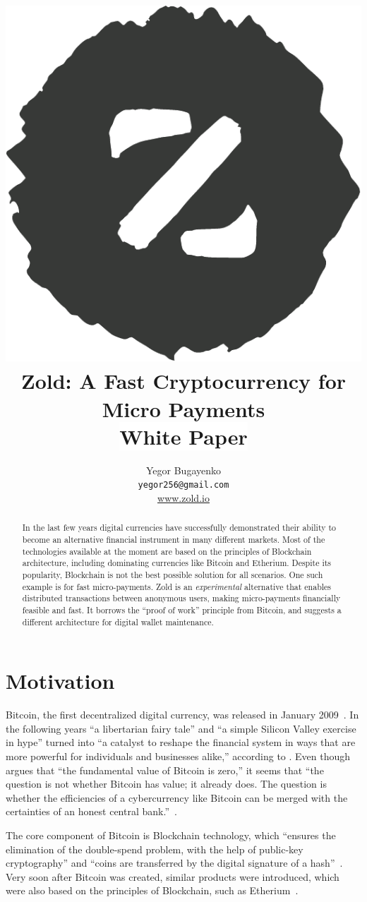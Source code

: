 \documentclass[11pt,oneside]{article}
\title{\includegraphics[scale=0.3]{../images/logo.pdf}\\Zold: A Fast Cryptocurrency for Micro Payments\\\colorbox{white}{White Paper}}
\author{Yegor Bugayenko\\
  \texttt{yegor256@gmail.com}\\
  \href{https://www.zold.io}{www.zold.io}\\[1em]
  \href{https://github.com/zold-io/papers/releases/tag/\zoldversion}{\texttt{\zoldversion}}}
\begin{document}
\raggedbottom

\maketitle
\begin{abstract}
In the last few years digital currencies have successfully demonstrated
their ability to become an alternative financial instrument in many
different markets. Most of the technologies available at the moment are
based on the principles of Blockchain architecture, including
dominating currencies like Bitcoin and Etherium. Despite its
popularity, Blockchain is not the best possible solution for all scenarios.
One such example is for fast micro-payments.
Zold is an \emph{experimental} alternative that enables distributed transactions between
anonymous users, making micro-payments financially feasible and fast.
It borrows the ``proof of work'' principle from Bitcoin,
and suggests a different architecture for digital wallet maintenance.
\end{abstract}

\section{Motivation}

Bitcoin, the first decentralized digital currency, was released in January 2009~\parencite{nakamoto2008}.
In the following years ``a libertarian fairy tale'' and ``a simple Silicon Valley exercise in hype''
turned into ``a catalyst to reshape the financial system in ways that are more
powerful for individuals and businesses alike,'' according to \textcite{andreessen2014}.
Even though \textcite{cheah2015} argues that
``the fundamental value of Bitcoin is zero,''
it seems that ``the question is not whether Bitcoin has value; it already does.
The question is whether the efficiencies of a cybercurrency
like Bitcoin can be merged with the certainties of an honest central bank.''~\parencite{van2014}.

The core component of Bitcoin is Blockchain technology, which
``ensures the elimination of the double-spend problem, with the help
of public-key cryptography'' and ``coins are transferred by the
digital signature of a hash''~\parencite{pilkington2016}.
Very soon after Bitcoin was created, similar products were introduced,
which were also based on the principles of Blockchain, such as
Etherium~\parencite{buterin2013}.
\end{document}

